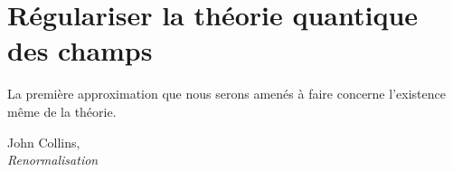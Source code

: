 \chapter{Régulariser la théorie quantique des champs}

\renewcommand{\epigraphwidth}{8.5cm}
\epigraph{La première approximation que nous serons amenés à faire concerne l'existence même de la théorie.}{John Collins,\\\textit{Renormalisation}~\cite{Collins1984}}




